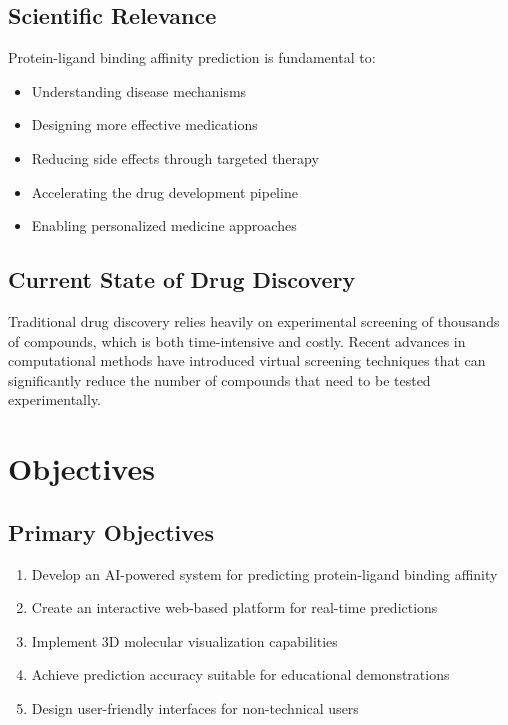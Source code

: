 \documentclass[12pt,a4paper]{article}
\begin{document}
\subsection{Scientific Relevance}
Protein-ligand binding affinity prediction is fundamental to:
\begin{itemize}
    \item Understanding disease mechanisms
    \item Designing more effective medications
    \item Reducing side effects through targeted therapy
    \item Accelerating the drug development pipeline
    \item Enabling personalized medicine approaches
\end{itemize}

\subsection{Current State of Drug Discovery}
Traditional drug discovery relies heavily on experimental screening of thousands of compounds, which is both time-intensive and costly. Recent advances in computational methods have introduced virtual screening techniques that can significantly reduce the number of compounds that need to be tested experimentally.


\section{Objectives}

\subsection{Primary Objectives}
\begin{enumerate}
    \item Develop an AI-powered system for predicting protein-ligand binding affinity
    \item Create an interactive web-based platform for real-time predictions
    \item Implement 3D molecular visualization capabilities
    \item Achieve prediction accuracy suitable for educational demonstrations
    \item Design user-friendly interfaces for non-technical users
\end{enumerate}
\end{document}
